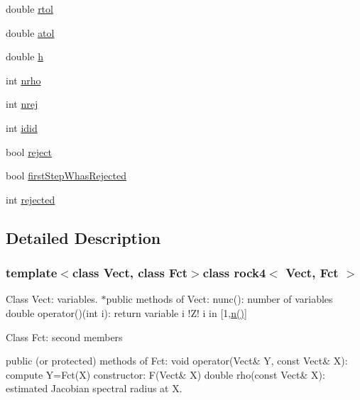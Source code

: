 \begin{DoxyCompactItemize}
\item 
double \hyperlink{classrock4_ad3ea883a184e7ffdf537a2040cf5c3a4}{rtol}
\item 
double \hyperlink{classrock4_a4f5a99fa4c2653e6e1d9fa7f67e77635}{atol}
\item 
double \hyperlink{classrock4_a6f524670ac0a00ad38e3cbdef112b849}{h}
\item 
int \hyperlink{classrock4_a86a70af8eb60ea3691965dc1b0b86a11}{nrho}
\item 
int \hyperlink{classrock4_ad9aec741705d486ec533f509030cd1b9}{nrej}
\item 
int \hyperlink{classrock4_a4a87f140af96e4d7821b5bc4a0667c0d}{idid}
\item 
bool \hyperlink{classrock4_a864fc2c22948d7a534b2b252fe3961f1}{reject}
\item 
bool \hyperlink{classrock4_afea690e04b3d36834f01c3d52c204fc1}{first\-Step\-Whas\-Rejected}
\item 
int \hyperlink{classrock4_ae609890de1109cba1f25bacc141c8731}{rejected}
\end{DoxyCompactItemize}


\subsection{Detailed Description}
\subsubsection*{template$<$class Vect, class Fct$>$class rock4$<$ Vect, Fct $>$}

Class Vect\-: variables. $\ast$public methods of Vect\-: nunc()\-: number of variables double operator()(int i)\-: return variable i !\-Z! i in \mbox{[}1,\hyperlink{classrock4_a2e8c8c2bb59af639b3fd8f36f9cb8862}{n()}\mbox{]}

Class Fct\-: second members
\begin{DoxyItemize}
\item public (or protected) methods of Fct\-: void operator(\-Vect\& Y, const Vect\& X)\-: compute Y=Fct(\-X) constructor\-: F(\-Vect\& X) double rho(const Vect\& X)\-: estimated Jacobian spectral radius at X. 
\end{DoxyItemize}

